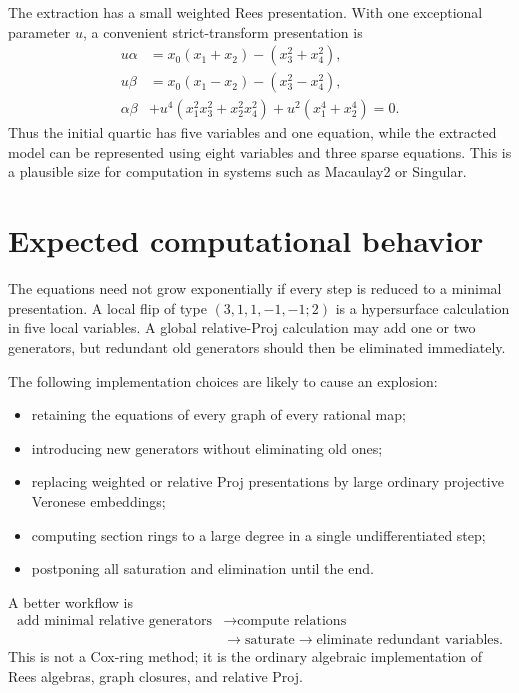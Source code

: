 \documentclass[11pt]{article}
\begin{document}
The extraction has a small weighted Rees presentation.  With one exceptional
parameter $u$, a convenient strict-transform presentation is
\begin{align*}
  u\alpha
    &=x_0(x_1+x_2)-(x_3^2+x_4^2),\\
  u\beta
    &=x_0(x_1-x_2)-(x_3^2-x_4^2),\\
  \alpha\beta
    &+u^4(x_1^2x_3^2+x_2^2x_4^2)
     +u^2(x_1^4+x_2^4)=0.
\end{align*}
Thus the initial quartic has five variables and one equation, while the
extracted model can be represented using eight variables and three sparse
equations.  This is a plausible size for computation in systems such as
Macaulay2 or Singular.

\section{Expected computational behavior}

The equations need not grow exponentially if every step is reduced to a
minimal presentation.  A local flip of type $(3,1,1,-1,-1;2)$ is a
hypersurface calculation in five local variables.  A global relative-Proj
calculation may add one or two generators, but redundant old generators should
then be eliminated immediately.

The following implementation choices are likely to cause an explosion:
\begin{itemize}
  \item retaining the equations of every graph of every rational map;
  \item introducing new generators without eliminating old ones;
  \item replacing weighted or relative Proj presentations by large ordinary
        projective Veronese embeddings;
  \item computing section rings to a large degree in a single undifferentiated
        step;
  \item postponing all saturation and elimination until the end.
\end{itemize}

A better workflow is
\[
  \begin{aligned}
  \text{add minimal relative generators}
    &\longrightarrow \text{compute relations}\\
    &\longrightarrow \text{saturate}
     \longrightarrow \text{eliminate redundant variables}.
  \end{aligned}
\]
This is not a Cox-ring method; it is the ordinary algebraic implementation of
Rees algebras, graph closures, and relative Proj.
\end{document}
